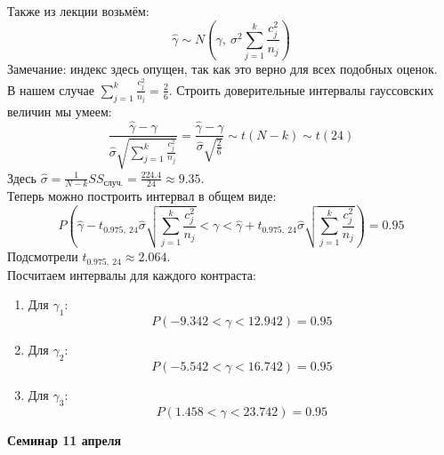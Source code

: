 \documentclass[12pt, a4paper]{article}
\begin{document}
Также из лекции возьмём:
\[\hat \gamma \sim N\left( \gamma,\ \sigma^2 \sum_{j = 1}^{k} \frac{c_j^2}{n_j} \right)\]
Замечание: индекс здесь опущен, так как это верно для всех подобных оценок.\\
В нашем случае $\displaystyle \sum_{j = 1}^{k} \frac{c_j^2}{n_j} = \frac{2}{6}$. Строить доверительные интервалы гауссовских величин мы умеем:
\[\frac{\hat \gamma - \gamma}{\hat \sigma \sqrt{\sum_{j = 1}^{k} \frac{c_j^2}{n_j}}} = \frac{\hat \gamma - \gamma}{\hat \sigma \sqrt{\frac{2}{6}}} \sim t(N - k) \sim t(24)\]
Здесь $\hat \sigma = \frac{1}{N - k} SS_{\text{случ.}} = \frac{224.4}{24} \approx 9.35$.\\
Теперь можно построить интервал в общем виде:
\[P\left(\hat \gamma -  t_{0.975,\ 24} \hat \sigma\sqrt{\sum_{j = 1}^{k} \frac{c_j^2}{n_j}} < \gamma < \hat \gamma +  t_{0.975,\ 24} \hat \sigma\sqrt{\sum_{j = 1}^{k} \frac{c_j^2}{n_j}}\right) = 0.95\]
Подсмотрели $t_{0.975,\ 24} \approx 2.064$.\\
Посчитаем интервалы для каждого контраста:
\begin{enumerate}
    \item Для $\gamma_1$:
    \[P\left( -9.342 < \gamma < 12.942 \right) = 0.95\]
    \item Для $\gamma_2$:
    \[P\left( -5.542 < \gamma < 16.742 \right) = 0.95\]
    \item Для $\gamma_3$:
    \[P\left( 1.458 < \gamma < 23.742 \right) = 0.95\]
\end{enumerate}

\begin{center}
    \bf Семинар 11 апреля
\end{center}
\end{document}
